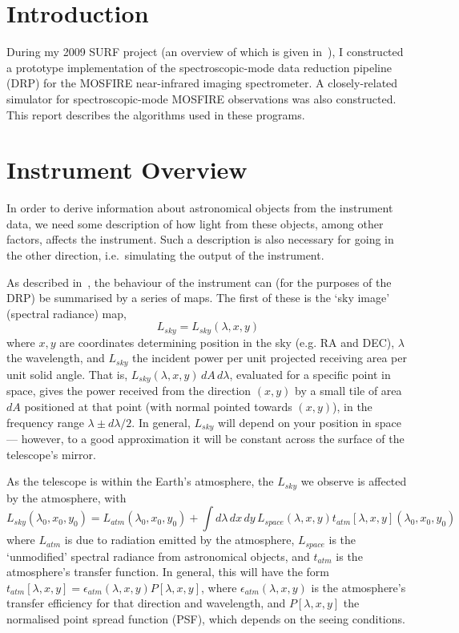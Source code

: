 \section{Introduction}

During my 2009 SURF project (an overview of which is given in~\cite{surfreport}),
I constructed a prototype implementation of the spectroscopic-mode
data reduction pipeline (DRP) for the MOSFIRE near-infrared imaging
spectrometer. A closely-related simulator for spectroscopic-mode MOSFIRE
observations was also constructed. This report describes the algorithms
used in these programs.

\section{Instrument Overview}

In order to derive information about astronomical objects
from the instrument data, we need some description of how light from these
objects, among other factors, affects the instrument. Such a description
is also necessary for going in the other direction, i.e.\ simulating
the output of the instrument.

As described in~\cite{surfreport}, the behaviour of the instrument can (for the
purposes of the DRP) be summarised by a series of maps. The first of
these is the `sky image' (spectral radiance) map,
\[
L_{sky} = L_{sky} (\lambda, x, y)
\]
where $x,y$ are coordinates determining position in the sky (e.g. RA
and DEC), $\lambda$ the wavelength, and $L_{sky}$ the incident power
per unit projected receiving area per unit solid angle. That is,
$L_{sky}(\lambda, x, y)\, dA \, d\lambda$, evaluated for a specific
point in space, gives the power received from the direction $(x,y)$
by a small tile of area $dA$ positioned at that point (with
normal pointed towards $(x,y)$), in the frequency range $\lambda \pm
d\lambda/2$. In general, $L_{sky}$ will depend on your position in
space --- however, to a good approximation it will be constant across
the surface of the telescope's mirror.

As the telescope is within the Earth's atmosphere, the $L_{sky}$
we observe is affected by the atmosphere, with
\[
L_{sky}(\lambda_0, x_0, y_0) = L_{atm}(\lambda_0, x_0, y_0) + \int d\lambda\, dx\, dy\, L_{space}(\lambda, x, y) t_{atm}[\lambda, x, y](\lambda_0, x_0, y_0)
\]
where $L_{atm}$ is due to radiation emitted by the atmosphere,
$L_{space}$ is the `unmodified' spectral radiance from astronomical
objects, and $t_{atm}$ is the atmosphere's transfer function.
In general, this will have the form $t_{atm}[\lambda, x, y] =
\epsilon_{atm}(\lambda, x, y) P[\lambda, x, y]$, where $\epsilon_{atm}
(\lambda, x, y)$ is the atmosphere's transfer efficiency for that
direction and wavelength, and $P[\lambda, x, y]$ the normalised point
spread function (PSF), which depends on the seeing conditions.

